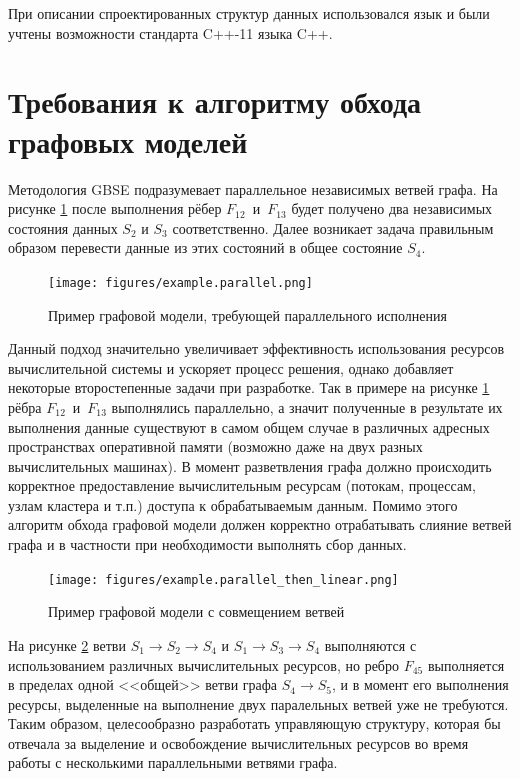 При описании спроектированных структур данных использовался язык  и были учтены возможности стандарта C++-11 языка C++.
\section{Требования к алгоритму обхода графовых моделей}\label{sec:algorithm_task}

Методология GBSE подразумевает параллельное независимых ветвей графа. На рисунке \ref{fig:parallelExample} после выполнения рёбер $F_{12}$~и~$F_{13}$ будет получено два независимых состояния данных $S_2$ и $S_3$ соответственно. Далее возникает задача правильным образом перевести данные из этих состояний в общее состояние $S_4$.
\begin{figure}[!ht]
    \centering
    \texttt{[image: figures/example.parallel.png]}
    \caption{Пример графовой модели, требующей параллельного исполнения}
    \label{fig:parallelExample}
\end{figure}

Данный подход значительно увеличивает эффективность использования ресурсов вычислительной системы и ускоряет процесс решения, однако добавляет некоторые второстепенные задачи при разработке. Так в примере на рисунке \ref{fig:parallelExample} рёбра $F_{12}$~и~$F_{13}$ выполнялись параллельно, а значит полученные в результате их выполнения данные существуют в самом общем случае в различных адресных пространствах оперативной памяти (возможно даже на двух разных вычислительных машинах). В момент разветвления графа должно происходить корректное предоставление вычислительным ресурсам (потокам, процессам, узлам кластера и т.п.) доступа к обрабатываемым данным. Помимо этого алгоритм обхода графовой модели должен корректно отрабатывать слияние ветвей графа и в частности при необходимости выполнять сбор данных.

\begin{figure}[!ht]
    \centering
    \texttt{[image: figures/example.parallel\_then\_linear.png]}
    \caption{Пример графовой модели с совмещением ветвей}
    \label{fig:parallelThenLinearExample}
\end{figure}

На рисунке \ref{fig:parallelThenLinearExample} ветви $S_1 \rightarrow S_2 \rightarrow S_4$ и $S_1 \rightarrow S_3 \rightarrow S_4$ выполняются с использованием различных вычислительных ресурсов, но ребро $F_{45}$ выполняется в пределах одной <<общей>> ветви графа $S_4 \rightarrow S_5$, и в момент его выполнения ресурсы, выделенные на выполнение двух паралельных ветвей уже не требуются. Таким образом, целесообразно разработать управляющую структуру, которая бы отвечала за выделение и освобождение вычислительных ресурсов во время работы с несколькими параллельными ветвями графа.

